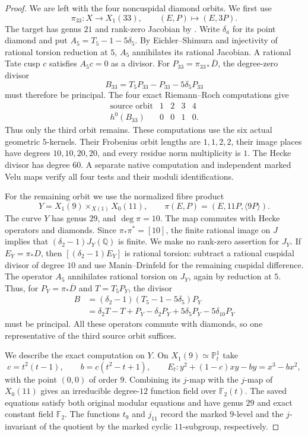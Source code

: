 \begin{proof}
We are left with the four noncuspidal diamond orbits. We first use
\[
 \pi_{33}:X\longrightarrow X_1(33),\qquad(E,P)\longmapsto(E,3P).
\]
The target has genus $21$ and rank-zero Jacobian by
\cite[Theorem~3.1]{DEHMZ}. Write $\delta_a$ for its point diamond
and put $A_5=T_5-1-5\delta_5$. By Eichler--Shimura and injectivity
of rational torsion reduction at $5$, $A_5$ annihilates its rational
Jacobian. A rational Tate cusp $c$ satisfies $A_5c=0$ as a divisor.
For $P_{33}=\pi_{33*}\overline D$, the degree-zero divisor
\[
                 B_{33}=T_5P_{33}-P_{33}-5\delta_5P_{33}
\]
must therefore be principal. The four exact Riemann--Roch
computations give
\[
 \begin{array}{c|rrrr}
 \text{source orbit}&1&2&3&4\\ \hline
 h^0(B_{33})&0&0&1&0.
 \end{array}
\]
Thus only the third orbit remains. These computations use the six
actual geometric $5$-kernels. Their Frobenius orbit lengths are
$1,1,2,2$, their image places have degrees $10,10,20,20$, and every
residue norm multiplicity is $1$. The Hecke divisor has degree $60$.
A separate native computation and independent marked Velu maps
verify all four tests and their moduli identifications.

For the remaining orbit we use the normalized fibre product
\[
 Y=X_1(9)\mathbin{\times}_{X(1)}X_0(11),\qquad
 \pi(E,P)=(E,11P,\langle9P\rangle).
\]
The curve $Y$ has genus $29$, and $\deg\pi=10$.
The map commutes with Hecke operators and diamonds.
Since $\pi_*\pi^*=[10]$, the finite rational image on $J$ implies
that $(\delta_2-1)J_Y(\mathbb Q)$ is finite. We make no rank-zero
assertion for $J_Y$.
If $E_Y=\pi_*D$, then $[(\delta_2-1)E_Y]$ is rational torsion:
subtract a rational cuspidal divisor of degree $10$ and use
Manin--Drinfeld for the remaining cuspidal difference.
The operator $A_5$ annihilates rational torsion on $J_Y$, again
by reduction at $5$. Thus, for $P_Y=\pi_*\overline D$ and
$T=T_5P_Y$, the divisor
\[
 \begin{split}
 B&=(\delta_2-1)(T_5-1-5\delta_5)P_Y\\
  &=\delta_2T-T+P_Y-\delta_2P_Y
                     +5\delta_5P_Y-5\delta_{10}P_Y
 \end{split}
\]
must be principal. All these operators commute with diamonds,
so one representative of the third source orbit suffices.

We describe the exact computation on $Y$.
On $X_1(9)\simeq\mathbb P^1_t$ take
\[
 c=t^2(t-1),\qquad b=c(t^2-t+1),\qquad
 E_t:y^2+(1-c)xy-by=x^3-bx^2,
\]
with the point $(0,0)$ of order $9$.
Combining its $j$-map with the $j$-map of $X_0(11)$ gives an
irreducible degree-$12$ function field over $\mathbb F_2(t)$.
The saved equations satisfy both original modular equations and
have genus $29$ and exact constant field $\mathbb F_2$.
The functions $t_9$ and $j_{11}$ record the marked $9$-level and
the $j$-invariant of the quotient by the marked cyclic
$11$-subgroup, respectively.


\end{proof}
